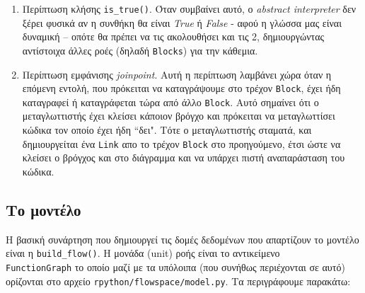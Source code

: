 \begin{enumerate}

\item Περίπτωση κλήσης \texttt{is\_true()}. Όταν συμβαίνει αυτό, ο \textit{
abstract interpreter} δεν ξέρει φυσικά αν η συνθήκη θα είναι \textit{True} ή
\textit{False} - αφού η γλώσσα μας είναι δυναμική – οπότε θα πρέπει να τις 
ακολουθήσει και τις 2, δημιουργώντας αντίστοιχα άλλες ροές (δηλαδή
\texttt{Blocks}) για την κάθεμια.

\item Περίπτωση εμφάνισης \textit{joinpoint}. Αυτή η περίπτωση λαμβάνει χώρα
όταν η επόμενη εντολή, που πρόκειται να καταγράψουμε στο τρέχον \texttt{Block},
έχει ήδη καταγραφεί ή καταγράφεται τώρα από άλλο \texttt{Block}. Αυτό σημαίνει
ότι ο μεταγλωττιστής έχει κλείσει κάποιον βρόγχο και πρόκειται να μεταγλωττίσει
κώδικα τον οποίο έχει ήδη ``δει". Τότε ο μεταγλωττιστής σταματά, και
δημιουργείται ένα \texttt{Link} απο το τρέχον \texttt{Block} στο προηγούμενο,
έτσι ώστε να κλείσει ο βρόγχος και στο διάγραμμα και να υπάρχει πιστή
αναπαράσταση του κώδικα.

\end{enumerate}

\subsection{Το μοντέλο}

Η βασική συνάρτηση που δημιουργεί τις δομές δεδομένων που απαρτίζουν το μοντέλο
είναι η \texttt{build\_flow()}. Η μονάδα (unit) ροής είναι το αντικείμενο \\
\texttt{FunctionGraph} το οποίο μαζί με τα υπόλοιπα (που συνήθως περιέχονται σε
αυτό) ορίζονται στο αρχείο \texttt{rpython/flowspace/model.py}. Τα περιγράφουμε
παρακάτω:

